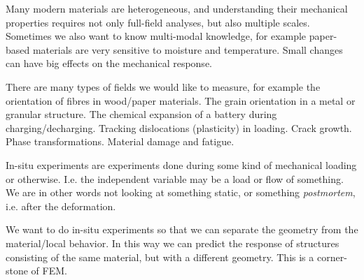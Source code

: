 Many modern materials are heterogeneous, and understanding their mechanical properties requires not only full-field analyses, but also multiple scales. Sometimes we also want to know multi-modal knowledge, for example paper-based materials are very sensitive to moisture and temperature. Small changes can have big effects on the mechanical response.

There are many types of fields we would like to measure, for example the orientation of fibres in wood/paper materials. The grain orientation in a metal or granular structure. The chemical expansion of a battery during charging/decharging. Tracking dislocations (plasticity) in loading. Crack growth. Phase transformations. Material damage and fatigue.

In-situ experiments are experiments done during some kind of mechanical loading or otherwise. I.e. the independent variable may be a load or flow of something. We are in other words not looking at something static, or something \textit{postmortem}, i.e. after the deformation.

We want to do in-situ experiments so that we can separate the geometry from the material/local behavior. In this way we can predict the response of structures consisting of the same material, but with a different geometry. This is a corner-stone of FEM.
